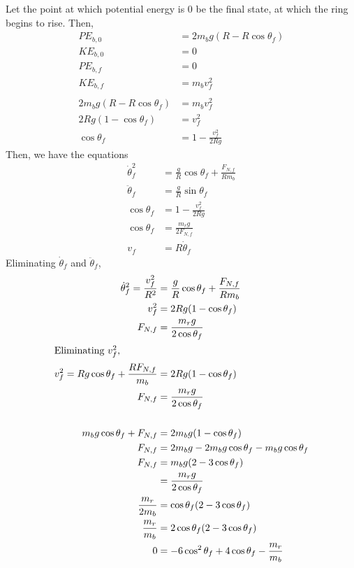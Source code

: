 \documentclass{esg8012pset}
\begin{document}
\begin{solution}
\begin{enumerate}[a)]
   Let the point at which potential energy is 0 be the final state, at which the ring begins to rise.  Then,
   \begin{align*}
    PE_{b, 0} & = 2 m_b g(R - R\cos\theta_f) \\
    KE_{b, 0} & = 0 \\
    PE_{b, f} & = 0 \\
    KE_{b, f} & = m_b v_f^2 \\
    \\
    2 m_b g(R - R\cos\theta_f) & = m_b v_f^2 \\
    2 R g(1 - \cos\theta_f) & = v_f^2 \\
    \cos\theta_f & = 1 - \frac{v_f^2}{2 R g}
   \end{align*}
   Then, we have the equations \begin{align*}
    \dot\theta_f^2 & = \frac{g}{R}\cos\theta_f + \frac{F_{N,f}}{R m_b} \\
    \ddot\theta_f & = \frac{g}{R}\sin\theta_f \\
    \cos\theta_f & = 1 - \frac{v_f^2}{2 R g} \\
    \cos\theta_f & = \frac{m_r g}{2F_{N,f}} \\
    v_f & = R \dot\theta_f
   \end{align*}
   Eliminating $\dot\theta_f$ and $\ddot\theta_f$,
   \begin{align*}
    \dot\theta_f^2 = \frac{v_f^2}{R^2} & = \frac{g}{R}\cos\theta_f + \frac{F_{N,f}}{R m_b} \\
    v_f^2 & = 2 R g(1 - \cos\theta_f) \\
    F_{N,f} & = \frac{m_r g}{2\cos\theta_f} \\
\intertext{Eliminating $v_f^2$,}
    v_f^2 = Rg\cos\theta_f + \frac{R F_{N,f}}{m_b} & = 2 R g(1 - \cos\theta_f) \\
    F_{N,f} & = \frac{m_r g}{2\cos\theta_f} \\
    \\
    m_b g\cos\theta_f + F_{N,f} & = 2 m_b g(1 - \cos\theta_f) \\
    F_{N,f} & = 2 m_b g - 2 m_b g \cos\theta_f - m_b g\cos\theta_f \\
    F_{N,f} & = m_b g(2 - 3\cos\theta_f) \\
     & = \frac{m_r g}{2\cos\theta_f} \\
    \frac{m_r}{2m_b} & = \cos\theta_f(2-3\cos\theta_f) \\
    \frac{m_r}{m_b} & = 2\cos\theta_f(2 - 3\cos\theta_f) \\
    0 & = -6\cos^2\theta_f + 4\cos\theta_f - \frac{m_r}{m_b} \\

\end{align*}
\end{enumerate}
\end{solution}
\end{document}
